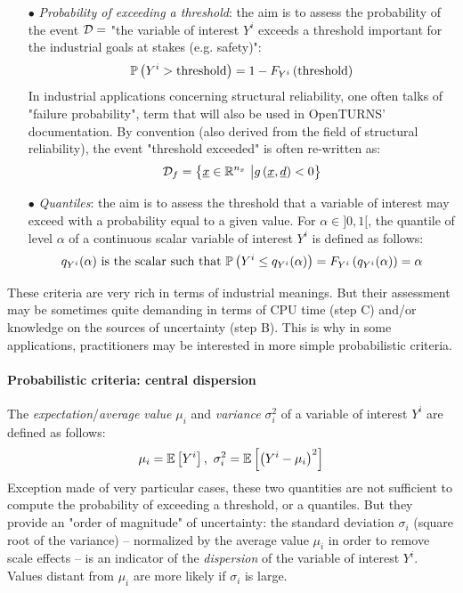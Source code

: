 \begin{itemize}
\item[$\bullet$] {\em Probability of exceeding a threshold}: the aim is to assess the probability of the event ${\mathcal D}=$ "the variable of interest $Y^i$ exceeds a threshold important for the industrial goals at stakes (e.g. safety)":
  \begin{align*}
    {\mathbb P}\left( Y^i > \textrm{threshold} \right) = 1 - F_{Y^i} \left( \textrm{threshold} \right)
  \end{align*}
  In industrial applications concerning structural reliability, one often talks of "failure probability", term that will also be used in OpenTURNS' documentation. By convention (also derived from the field of structural reliability), the event "threshold exceeded" is often re-written as:
  \begin{align*}
    {\mathcal D}_f= \big\{ {\underline{x}} \in {\mathbb R}^{n_x} \ \big| g\left( \underline{x},\underline{d} \right) < 0 \big\}
  \end{align*}
\item[$\bullet$] {\em Quantiles}:  the aim is to assess the threshold that a variable of interest may exceed with a probability equal to a given value. For $\alpha \in ]0,1[$, the quantile of level $\alpha$ of a continuous scalar variable of interest $Y^i$ is defined as follows:
    \begin{align*}
      q_{Y^i}(\alpha) \ \mbox{is the scalar such that}\ {\mathbb P}\left( Y^i \leq q_{Y^i}(\alpha) \right) = F_{Y^i} \left( q_{Y^i}(\alpha) \right) = \alpha
    \end{align*}
\end{itemize}

These criteria are very rich in terms of industrial meanings. But their assessment may be sometimes quite demanding in terms of CPU time (step C) and/or knowledge on the sources of uncertainty (step B). This is why in some applications, practitioners may be interested in more simple probabilistic criteria.

\paragraph{Probabilistic criteria: central dispersion}
\par

The {\em expectation}/{\em average value} $\mu_{i}$ and {\em variance} $\sigma^2_{i}$ of a variable of interest $Y^i$ are defined as follows:
\begin{align*}
  \mu_{i} = {\mathbb E}\left[ Y^i \right], \ \sigma^2_{i} = {\mathbb E}\left[ \left(Y^i - \mu_{i} \right)^2 \right]
\end{align*}
Exception made of very particular cases, these two quantities are not sufficient to compute the probability of exceeding a threshold, or a quantiles. But they provide an "order of magnitude" of uncertainty: the standard deviation $\sigma_{i}$ (square root of the variance) -- normalized by the average value $\mu_{i}$ in order to remove scale effects -- is an indicator of the {\em dispersion} of the variable of interest $Y^i$. Values distant from $\mu_{i}$ are more likely if $\sigma_{i}$ is large.

